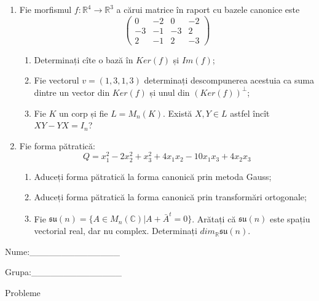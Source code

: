 \documentclass{article}
\begin{document}
\begin{enumerate}
 \item Fie morfismul $f:\mathbb{R}^4 \to \mathbb{R}^3$ a cărui matrice în raport cu bazele canonice este
$$\begin{pmatrix}
0&-2&0&-2\\
-3&-1&-3&2\\
2&-1&2&-3
\end{pmatrix}$$

\begin{enumerate}
\item Determinați cîte o bază în $Ker(f)$ și $Im(f)$;
\item Fie vectorul $v=(1,3,1,3)$ determinați descompunerea acestuia ca suma dintre un vector din $Ker(f)$ și unul din $(Ker(f))^\perp$;
\item Fie $K$ un corp și fie $L=M_n(K)$. Există $X,Y \in L$ astfel încît $XY-YX=I_n$?  
\end{enumerate}
\item Fie forma pătratică:
$$Q= x_1^2-2x_2^2+x_3^2+4x_1x_2-10x_1x_3+4x_2x_3$$

\begin{enumerate}
\item Aduceți forma pătratică la forma canonică prin metoda Gauss;
\item Aduceți forma pătratică la forma canonică prin transformări ortogonale;
\item Fie $\mathfrak{su}(n)=\{ A \in M_n(\mathbb{C}) | A+\bar{A}^t=0\}$. Arătați că $\mathfrak{su}(n)$ este spațiu vectorial real, dar nu complex.
Determinați $dim_{\mathbb{R}}\mathfrak{su}(n)$.
\end{enumerate}
\end{enumerate}
\newpage
\begin{flushright}
Nume:\_\_\_\_\_\_\_\_\_\_\_\_\_\_
 
 
Grupa:\_\_\_\_\_\_\_\_\_\_\_\_\_\_
\end{flushright}
\begin{center}
\vspace{2cm}
{\Large Probleme}
\vspace{2cm}
\end{center}
\end{document}
